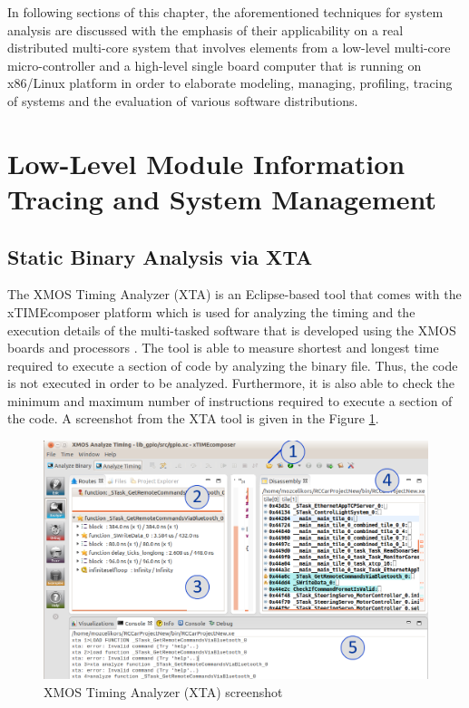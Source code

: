In following sections of this chapter, the aforementioned techniques for system analysis are discussed with the emphasis of their applicability on a real distributed multi-core system that involves elements from a low-level multi-core micro-controller and a high-level single board computer that is running on x86/Linux platform in order to elaborate  modeling, managing, profiling, tracing of systems and the evaluation of various software distributions.

\section{Low-Level Module Information Tracing and System Management}
\subsection{Static Binary Analysis via XTA} \label{staticbinary}
The XMOS Timing Analyzer (XTA) \cite{xtamanual} is an Eclipse-based tool that comes with the xTIMEcomposer platform which is used for analyzing the timing and the execution details of the multi-tasked software that is developed using the XMOS boards and processors \cite{xtamanual}. The tool is able to measure shortest and longest time required to execute a section of code by analyzing the binary file. Thus, the code is not executed in order to be analyzed. Furthermore, it is also able to check the minimum and maximum number of instructions required to execute a section of the code.  A screenshot from the XTA tool is given in the Figure \ref{fig:xtass}.

\begin{figure}[!ht]
	\centering
	\captionsetup{justification=centering}
	\includegraphics[width=\textwidth]{content/images/xtass.png}
	\caption{XMOS Timing Analyzer (XTA) screenshot}
	\label{fig:xtass}
\end{figure}

